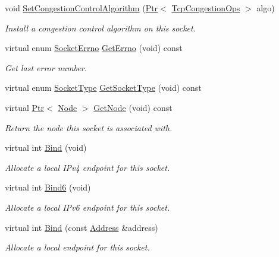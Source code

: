 \begin{DoxyCompactItemize}
void \hyperlink{classns3_1_1TcpSocketBase_acc21ee26be8b33d0b4e82703153a7fc8}{Set\+Congestion\+Control\+Algorithm} (\hyperlink{classns3_1_1Ptr}{Ptr}$<$ \hyperlink{classns3_1_1TcpCongestionOps}{Tcp\+Congestion\+Ops} $>$ algo)
\begin{DoxyCompactList}\small\item\em Install a congestion control algorithm on this socket. \end{DoxyCompactList}\item 
virtual enum \hyperlink{classns3_1_1Socket_ada1328c5ae0c28cb2a982caf8f6d6cca}{Socket\+Errno} \hyperlink{classns3_1_1TcpSocketBase_a7ea2ab815e861e653803fbe82787c92f}{Get\+Errno} (void) const 
\begin{DoxyCompactList}\small\item\em Get last error number. \end{DoxyCompactList}\item 
virtual enum \hyperlink{classns3_1_1Socket_a698fbcc486a48b7a0d2b0e4ab863d571}{Socket\+Type} \hyperlink{classns3_1_1TcpSocketBase_ab491cb3bfc9f1a0f77f5c53d3e813727}{Get\+Socket\+Type} (void) const 
\item 
virtual \hyperlink{classns3_1_1Ptr}{Ptr}$<$ \hyperlink{classns3_1_1Node}{Node} $>$ \hyperlink{classns3_1_1TcpSocketBase_afaca88563d7dc2bb8d5abdb8d9ace59b}{Get\+Node} (void) const 
\begin{DoxyCompactList}\small\item\em Return the node this socket is associated with. \end{DoxyCompactList}\item 
virtual int \hyperlink{classns3_1_1TcpSocketBase_a7a9a87b74c1ce59ac89df8d9221681dd}{Bind} (void)
\begin{DoxyCompactList}\small\item\em Allocate a local I\+Pv4 endpoint for this socket. \end{DoxyCompactList}\item 
virtual int \hyperlink{classns3_1_1TcpSocketBase_abe62bb701ac4f057199d5c34938a96a9}{Bind6} (void)
\begin{DoxyCompactList}\small\item\em Allocate a local I\+Pv6 endpoint for this socket. \end{DoxyCompactList}\item 
virtual int \hyperlink{classns3_1_1TcpSocketBase_a86469a9087181185895314d8da713f35}{Bind} (const \hyperlink{classns3_1_1Address}{Address} \&address)
\begin{DoxyCompactList}\small\item\em Allocate a local endpoint for this socket. \end{DoxyCompactList}\item 

\end{DoxyCompactItemize}
